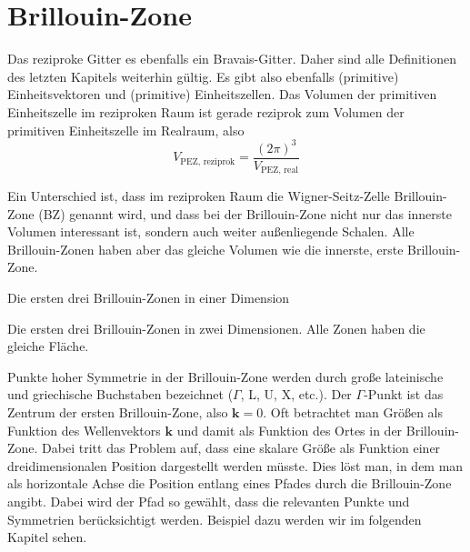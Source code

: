 \section{Brillouin-Zone}

Das reziproke Gitter es ebenfalls ein Bravais-Gitter. Daher sind alle Definitionen des letzten Kapitels weiterhin gültig. Es gibt also ebenfalls (primitive) Einheitsvektoren und (primitive) Einheitszellen. Das Volumen der primitiven Einheitszelle im reziproken Raum ist gerade reziprok zum Volumen der primitiven Einheitszelle im Realraum, also
\begin{equation}
V_\text{PEZ, reziprok} = \frac{(2 \pi)^3}{V_\text{PEZ, real} }
\end{equation}

Ein Unterschied ist, dass im reziproken Raum die Wigner-Seitz-Zelle Brillouin-Zone (BZ) genannt wird, und dass bei der Brillouin-Zone nicht nur das innerste Volumen interessant ist, sondern auch weiter außenliegende Schalen. Alle  Brillouin-Zonen haben aber das gleiche Volumen wie die innerste, erste  Brillouin-Zone.


\begin{marginfigure}

\caption{Die ersten drei Brillouin-Zonen in einer Dimension}
\end{marginfigure}

\begin{marginfigure}

\caption{Die ersten drei Brillouin-Zonen in zwei Dimensionen. Alle Zonen haben die gleiche Fläche.}
\end{marginfigure}

Punkte hoher Symmetrie in der Brillouin-Zone werden durch große lateinische und griechische Buchstaben bezeichnet ($\Gamma$, L, U, X, etc.). Der $\Gamma$-Punkt ist das Zentrum der ersten Brillouin-Zone, also $\mathbf{k} = 0$. Oft betrachtet man Größen als Funktion des Wellenvektors  $\mathbf{k} $ und damit als Funktion des Ortes in der Brillouin-Zone. Dabei tritt das Problem auf, dass eine skalare Größe als Funktion einer dreidimensionalen Position dargestellt werden müsste. Dies löst man, in dem man als horizontale Achse die Position entlang eines Pfades durch die Brillouin-Zone angibt. Dabei wird der Pfad so gewählt, dass die relevanten Punkte und Symmetrien berücksichtigt werden. Beispiel dazu werden wir im folgenden Kapitel sehen.



